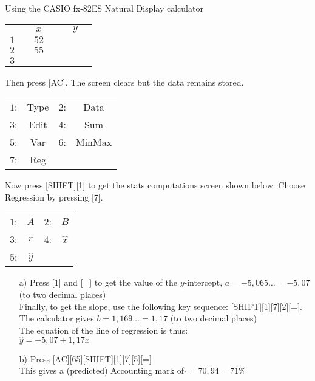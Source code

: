\begin{wex}{Using the CASIO fx-82ES Natural Display calculator}
{\begin{center}
\begin{tabular}{c|c c c|c c c}
 & & $x$ & & & $y$ &\\
$1$& & $52$ & & & & \\
$2$& & $55$ & & & & \\
$3$& & & & & & \\
\end{tabular}
\end{center}

Then press [AC]. The screen clears but the data remains stored.

\begin{center}
\begin{tabular}{|c c c c|}\hline
$1$: & Type & $2$: & Data \\
$3$: & Edit & $4$: & Sum \\
$5$: & Var & $6$: & MinMax \\
$7$: & Reg &  &  \\\hline
\end{tabular}
\end{center}

Now press [SHIFT][1] to get the stats computations screen shown below. Choose Regression by pressing [7].

\begin{center}
\begin{tabular}{|c c c c|}\hline
$1$: & $A$ & $2$: & $B$ \\
$3$: & $r$ & $4$: & $\hat{x}$ \\
$5$: & $\hat{y}$ & & \\ \hline
\end{tabular}
\end{center}

\begin{enumerate}

\item[a)] Press [1] and [=] to get the value of the $y$-intercept, $a = -5,065\ldots= -5,07 $ (to two decimal places)\\
Finally, to get the slope, use the following key sequence: [SHIFT][1][7][2][=]. The calculator gives $b = 1,169\ldots = 1,17$ (to two decimal places)\\

The equation of the line of regression is thus:\\
$\hat{y} =-5,07  + 1,17 x$\\

\item[b)] Press [AC][65][SHIFT][1][7][5][=]\\
 This gives a (predicted) Accounting mark of $\hat{} = 70,94 = 71$\%
\end{enumerate}

}
\end{wex}

